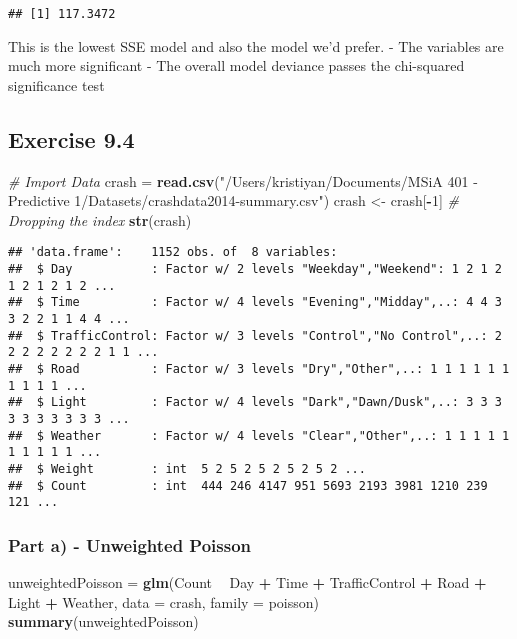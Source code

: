 \documentclass[]{article}
\newenvironment{Shaded}{\begin{snugshade}}{\end{snugshade}}
\newcommand{\CommentTok}[1]{\textcolor[rgb]{0.56,0.35,0.01}{\textit{#1}}}
\newcommand{\DataTypeTok}[1]{\textcolor[rgb]{0.13,0.29,0.53}{#1}}
\newcommand{\DecValTok}[1]{\textcolor[rgb]{0.00,0.00,0.81}{#1}}
\newcommand{\KeywordTok}[1]{\textcolor[rgb]{0.13,0.29,0.53}{\textbf{#1}}}
\newcommand{\NormalTok}[1]{#1}
\newcommand{\OperatorTok}[1]{\textcolor[rgb]{0.81,0.36,0.00}{\textbf{#1}}}
\newcommand{\StringTok}[1]{\textcolor[rgb]{0.31,0.60,0.02}{#1}}
\begin{document}
\begin{verbatim}
## [1] 117.3472
\end{verbatim}

This is the lowest SSE model and also the model we'd prefer. - The
variables are much more significant - The overall model deviance passes
the chi-squared significance test

\hypertarget{exercise-9.4}{%
\subsection{Exercise 9.4}\label{exercise-9.4}}

\begin{Shaded}
\begin{Highlighting}[]
\CommentTok{# Import Data}
\NormalTok{crash =}\StringTok{ }\KeywordTok{read.csv}\NormalTok{(}\StringTok{"/Users/kristiyan/Documents/MSiA 401 - Predictive 1/Datasets/crashdata2014-summary.csv"}\NormalTok{)}
\NormalTok{crash <-}\StringTok{ }\NormalTok{crash[}\OperatorTok{-}\DecValTok{1}\NormalTok{] }\CommentTok{# Dropping the index}
\KeywordTok{str}\NormalTok{(crash)}
\end{Highlighting}
\end{Shaded}

\begin{verbatim}
## 'data.frame':    1152 obs. of  8 variables:
##  $ Day           : Factor w/ 2 levels "Weekday","Weekend": 1 2 1 2 1 2 1 2 1 2 ...
##  $ Time          : Factor w/ 4 levels "Evening","Midday",..: 4 4 3 3 2 2 1 1 4 4 ...
##  $ TrafficControl: Factor w/ 3 levels "Control","No Control",..: 2 2 2 2 2 2 2 2 1 1 ...
##  $ Road          : Factor w/ 3 levels "Dry","Other",..: 1 1 1 1 1 1 1 1 1 1 ...
##  $ Light         : Factor w/ 4 levels "Dark","Dawn/Dusk",..: 3 3 3 3 3 3 3 3 3 3 ...
##  $ Weather       : Factor w/ 4 levels "Clear","Other",..: 1 1 1 1 1 1 1 1 1 1 ...
##  $ Weight        : int  5 2 5 2 5 2 5 2 5 2 ...
##  $ Count         : int  444 246 4147 951 5693 2193 3981 1210 239 121 ...
\end{verbatim}

\hypertarget{part-a---unweighted-poisson}{%
\subsubsection{Part a) - Unweighted
Poisson}\label{part-a---unweighted-poisson}}

\begin{Shaded}
\begin{Highlighting}[]
\NormalTok{unweightedPoisson =}\StringTok{ }\KeywordTok{glm}\NormalTok{(Count }\OperatorTok{~}\StringTok{ }\NormalTok{Day }\OperatorTok{+}\StringTok{ }\NormalTok{Time }\OperatorTok{+}\StringTok{ }\NormalTok{TrafficControl }\OperatorTok{+}\StringTok{ }\NormalTok{Road }\OperatorTok{+}\StringTok{ }\NormalTok{Light }\OperatorTok{+}\StringTok{ }\NormalTok{Weather, }\DataTypeTok{data =}\NormalTok{ crash, }\DataTypeTok{family =}\NormalTok{ poisson)}
\KeywordTok{summary}\NormalTok{(unweightedPoisson)}
\end{Highlighting}
\end{Shaded}
\end{document}
